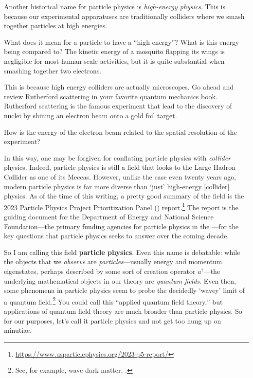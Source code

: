 \documentclass[12pt, oneside]{report}    %
\begin{document}
Another historical name for particle physics is \emph{high-energy physics}. This is because our experimental apparatuses are traditionally colliders where we smash together particles at high energies. 
\begin{exercise}
What does it mean for a particle to have a ``high energy''? What is this energy being compared to? The kinetic energy of a mosquito flapping its wings is negligible for most human-scale activities, but it is quite substantial when smashing together two electrons.
\end{exercise}
This is because high energy colliders are actually microscopes. Go ahead and review Rutherford scattering in your favorite quantum mechanics book. Rutherford scattering is the famous experiment that lead to the discovery of nuclei by shining an electron beam onto a gold foil target. 
\begin{exercise}
How is the energy of the electron beam related to the spatial resolution of the experiment?
\end{exercise}
In this way, one may be forgiven for conflating particle physics with \emph{collider} physics. Indeed, particle physics is still a field that looks to the Large Hadron Collider as one of its Meccas. However, unlike the case even twenty years ago, modern particle physics is far more diverse than `just' high-energy [collider] physics. As of the time of this writing, a pretty good summary of the field is the 2023 Particle Physics Project Prioritization Panel () report.\footnote{\url{https://www.usparticlephysics.org/2023-p5-report/}} The report is the guiding document for the Department of Energy and National Science Foundation---the primary funding agencies for particle physics in the ---for the key questions that particle physics seeks to answer over the coming decade.

So I am calling this field \textbf{particle physics}. Even this name is debatable: while the objects that we \emph{observe} are \emph{particles}---usually energy and momentum eigenstates, perhaps described by some sort of creation operator $a^\dag$---the underlying mathematical objects in our theory are \emph{quantum fields}. Even then, some phenomena in particle physics seem to probe the decidedly `wavey' limit of a quantum field.\footnote{See, for example, wave dark matter, .} You could call this ``applied quantum field theory,'' but applications of quantum field theory are much broader than particle physics. So for our purposes, let's call it particle physics and not get too hung up on minutiae.
\end{document}
